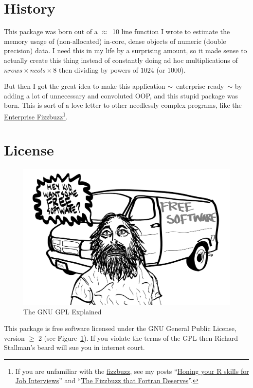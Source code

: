 \section{History}

This package was born out of a $\approx$~10 line function I wrote to estimate the memory usage of (non-allocated) in-core, dense  objects of numeric (double precision) data.  I need this in my life by a surprising amount, so it made sense to actually create this thing instead of constantly doing ad hoc multiplications of $nrows\times ncols \times 8$ then dividing by powers of $1024$ (or 1000).

But then I got the great idea to make this application $\sim$~\hspace{-.1cm}enterprise ready\hspace{-.1cm}~$\sim$ by adding a lot of unnecessary and convoluted OOP, and this stupid package was born.  This is sort of a love letter to other needlessly complex programs, like the \href{https://github.com/Mikkeren/FizzBuzzEnterpriseEdition}{Enterprise Fizzbuzz}\footnote{If you are unfamiliar with the \href{https://en.wikipedia.org/wiki/Bizz_buzz}{fizzbuzz}, see my posts ``\href{http://librestats.com/2012/01/10/honing-your-r-skills-for-job-interviews/}{Honing your R skills for Job Interviews}'' and ``\href{http://librestats.com/2013/04/26/the-fizzbuzz-that-fortran-deserves/}{The Fizzbuzz that Fortran Deserves}''.}.



\section{License}

\begin{figure}[th]
  \centering
  \includegraphics[scale=.35]{./include/gpl.png}
  \caption{The GNU GPL Explained}
  \label{fig:gnu}
\end{figure}
This package is free software licensed under the GNU General Public License, version $\geq$ 2 (see Figure~\ref{fig:gnu}).
If you violate the terms of the GPL then Richard Stallman's beard will sue you in internet court.




